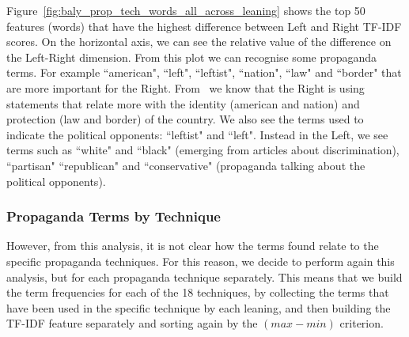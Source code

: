 Figure~\ref{fig:baly_prop_tech_words_all_across_leaning} shows the top 50 features (words) that have the highest difference between Left and Right TF-IDF scores.
On the horizontal axis, we can see the relative value of the difference on the Left-Right dimension.
From this plot we can recognise some propaganda terms.
For example ``american", ``left", ``leftist", ``nation", ``law" and ``border" that are more important for the Right. From~\citet{seargeant2020art} we know that the Right is using statements
that relate more with the identity  (american and nation) and protection  (law and border) of the country.
We also see the terms used to indicate the political opponents: ``leftist" and ``left".
Instead in the Left, we see terms such as ``white" and ``black" (emerging from articles about discrimination), ``partisan" ``republican" and ``conservative" (propaganda talking about the political opponents). 

\subsubsection{Propaganda Terms by Technique}
However, from this analysis, it is not clear how the terms found relate to the specific propaganda techniques. For this reason, we decide to perform again this analysis, but for each propaganda technique separately.
This means that we build the term frequencies for each of the 18 techniques, by collecting the terms that have been used in the specific technique by each leaning, and then building the TF-IDF feature separately and sorting again by the $(max - min)$ criterion.


